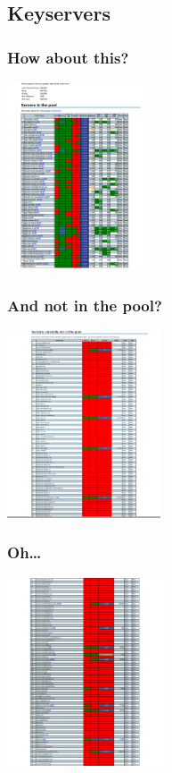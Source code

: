 \documentclass[aspectratio=1610,bigger,utf8]{beamer}
\begin{document}
\subsection{Keyservers}
\begin{frame}
	\frametitle{How about this?}
	\begin{center}
		\includegraphics[height=210px]{sks-1}
	\end{center}
\end{frame}
\begin{frame}
	\frametitle{And not in the pool?}
	\begin{center}
		\includegraphics[height=210px]{sks-2}
	\end{center}
\end{frame}
\begin{frame}
	\frametitle{Oh\ldots}
	\begin{center}
		\includegraphics[height=210px]{sks-3}
	\end{center}
\end{frame}
\end{document}
